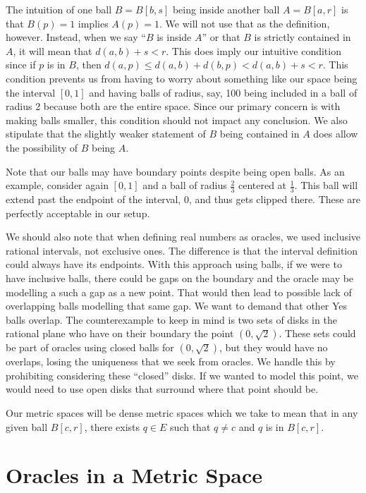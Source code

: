\documentclass[12pt]{article}
\begin{document}
The intuition of one ball $B= B[b,s]$ being inside another ball $A= B[a, r]$ is that  $B(p) = 1$ implies $A(p) = 1$. We will not use that as the definition, however. Instead, when we say ``$B$ is inside $A$'' or that $B$ is strictly contained in $A$, it will mean that $d(a,b) + s < r$. This does imply our intuitive condition since if $p$ is in $B$, then $d(a, p) \leq d(a, b) + d(b, p) < d(a,b) + s < r$. This condition prevents us from having to worry about something like our space being the interval $[0, 1]$ and having balls of radius, say, 100 being included in a ball of radius 2 because both are the entire space. Since our primary concern is with making balls smaller, this condition should not impact any conclusion. We also stipulate that the slightly weaker statement of $B$ being contained in $A$ does allow the possibility of $B$ being $A$. 

Note that our balls may have boundary points despite being open balls. As an example, consider again $[0,1]$ and a ball of radius $\frac{2}{3}$ centered at $\frac{1}{3}$. This ball will extend past the endpoint of the interval, $0$, and thus gets clipped there. These are perfectly acceptable in our setup. 

We should also note that when defining real numbers as oracles, we used inclusive rational intervals, not exclusive ones. The difference is that the interval definition could always have its endpoints. With this approach using balls, if we were to have inclusive balls, there could be gaps on the boundary and the oracle may be modelling a such a gap as a new point. That would then lead to possible lack of overlapping balls modelling that same gap. We want to demand that other Yes balls overlap. The counterexample to keep in mind is two sets of disks in the rational plane who have on their boundary the point $(0, \sqrt{2})$. These sets could be part of oracles using closed balls for $(0, \sqrt{2})$, but they would have no overlaps, losing the uniqueness that we seek from oracles. We handle this by prohibiting considering these ``closed'' disks. If we wanted to model this point, we would need to use open disks that surround where that point should be. 

Our metric spaces will be dense metric spaces which we take to mean that in any given ball $B[c,r]$, there exists $q \in E$ such that $q \neq c$ and $q$ is in $B[c,r]$.

\section{Oracles in a Metric Space}
\end{document}
